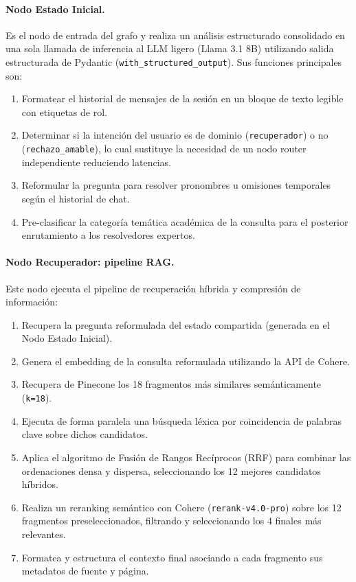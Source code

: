 \documentclass[12pt,a4paper,oneside]{report}
\begin{document}
\paragraph{Nodo Estado Inicial.} Es el nodo de entrada del grafo y realiza un análisis estructurado consolidado en una sola llamada de inferencia al LLM ligero (Llama 3.1 8B) utilizando salida estructurada de Pydantic (\texttt{with\_structured\_output}). Sus funciones principales son:
\begin{enumerate}
    \item Formatear el historial de mensajes de la sesión en un bloque de texto legible con etiquetas de rol.
    \item Determinar si la intención del usuario es de dominio (\texttt{recuperador}) o no (\texttt{rechazo\_amable}), lo cual sustituye la necesidad de un nodo router independiente reduciendo latencias.
    \item Reformular la pregunta para resolver pronombres u omisiones temporales según el historial de chat.
    \item Pre-clasificar la categoría temática académica de la consulta para el posterior enrutamiento a los resolvedores expertos.
\end{enumerate}

\paragraph{Nodo Recuperador: pipeline RAG.} Este nodo ejecuta el pipeline de recuperación híbrida y compresión de información:
\begin{enumerate}
    \item Recupera la pregunta reformulada del estado compartida (generada en el Nodo Estado Inicial).
    \item Genera el embedding de la consulta reformulada utilizando la API de Cohere.
    \item Recupera de Pinecone los 18 fragmentos más similares semánticamente (\texttt{k=18}).
    \item Ejecuta de forma paralela una búsqueda léxica por coincidencia de palabras clave sobre dichos candidatos.
    \item Aplica el algoritmo de Fusión de Rangos Recíprocos (RRF) para combinar las ordenaciones densa y dispersa, seleccionando los 12 mejores candidatos híbridos.
    \item Realiza un reranking semántico con Cohere (\texttt{rerank-v4.0-pro}) sobre los 12 fragmentos preseleccionados, filtrando y seleccionando los 4 finales más relevantes.
    \item Formatea y estructura el contexto final asociando a cada fragmento sus metadatos de fuente y página.
\end{enumerate}
\end{document}
